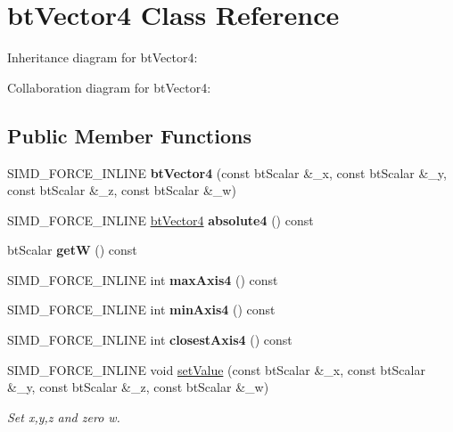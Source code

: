 \hypertarget{classbt_vector4}{\section{bt\+Vector4 Class Reference}
\label{classbt_vector4}
}


Inheritance diagram for bt\+Vector4\+:


Collaboration diagram for bt\+Vector4\+:
\subsection*{Public Member Functions}
\begin{DoxyCompactItemize}
\item 
\hypertarget{classbt_vector4_a0bea2b686b70b34f200c5b9170313a8f}{S\+I\+M\+D\+\_\+\+F\+O\+R\+C\+E\+\_\+\+I\+N\+L\+I\+N\+E {\bfseries bt\+Vector4} (const bt\+Scalar \&\+\_\+x, const bt\+Scalar \&\+\_\+y, const bt\+Scalar \&\+\_\+z, const bt\+Scalar \&\+\_\+w)}\label{classbt_vector4_a0bea2b686b70b34f200c5b9170313a8f}

\item 
\hypertarget{classbt_vector4_a6f7ae67c24305119c6418fda68cd478a}{S\+I\+M\+D\+\_\+\+F\+O\+R\+C\+E\+\_\+\+I\+N\+L\+I\+N\+E \hyperlink{classbt_vector4}{bt\+Vector4} {\bfseries absolute4} () const }\label{classbt_vector4_a6f7ae67c24305119c6418fda68cd478a}

\item 
\hypertarget{classbt_vector4_a3253ee96c2a48764c27fbfabf4951965}{bt\+Scalar {\bfseries get\+W} () const }\label{classbt_vector4_a3253ee96c2a48764c27fbfabf4951965}

\item 
\hypertarget{classbt_vector4_ae4de03b99f95e3cd9462504d76c326c1}{S\+I\+M\+D\+\_\+\+F\+O\+R\+C\+E\+\_\+\+I\+N\+L\+I\+N\+E int {\bfseries max\+Axis4} () const }\label{classbt_vector4_ae4de03b99f95e3cd9462504d76c326c1}

\item 
\hypertarget{classbt_vector4_ae643ac2951ff09ab50850acfe23b6d4f}{S\+I\+M\+D\+\_\+\+F\+O\+R\+C\+E\+\_\+\+I\+N\+L\+I\+N\+E int {\bfseries min\+Axis4} () const }\label{classbt_vector4_ae643ac2951ff09ab50850acfe23b6d4f}

\item 
\hypertarget{classbt_vector4_a2bf0d4272e2363dfae0725a39ef86a2f}{S\+I\+M\+D\+\_\+\+F\+O\+R\+C\+E\+\_\+\+I\+N\+L\+I\+N\+E int {\bfseries closest\+Axis4} () const }\label{classbt_vector4_a2bf0d4272e2363dfae0725a39ef86a2f}

\item 
S\+I\+M\+D\+\_\+\+F\+O\+R\+C\+E\+\_\+\+I\+N\+L\+I\+N\+E void \hyperlink{classbt_vector4_a7653b136836ef8c5f66d20cb11a86ceb}{set\+Value} (const bt\+Scalar \&\+\_\+x, const bt\+Scalar \&\+\_\+y, const bt\+Scalar \&\+\_\+z, const bt\+Scalar \&\+\_\+w)
\begin{DoxyCompactList}\small\item\em Set x,y,z and zero w. \end{DoxyCompactList}\end{DoxyCompactItemize}


